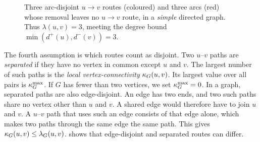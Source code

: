 \begin{figure}[ht]

\caption{Three arc-disjoint $u\to v$ routes (coloured) and three arcs (red) whose removal leaves no $u\to v$ route, in a \emph{simple} directed graph. Thus $\lambda(u,v)=3$, meeting the degree bound $\min(d^+(u),d^-(v))=3$.}
\label{fig:directed-lambda}
\end{figure}

The fourth assumption is which routes count as disjoint.
Two $u$--$v$ paths are \emph{separated} if they have no vertex in common except $u$ and $v$.
The largest number of such paths is the \emph{local vertex-connectivity} $\kappa_G(u,v)$.
Its largest value over all pairs is $\kappa_G^{\max}$.
If $G$ has fewer than two vertices, we set $\kappa_G^{\max}=0$.
In a graph, separated paths are also edge-disjoint. An edge has two ends, and two such paths share no vertex other than $u$ and $v$. A shared edge would therefore have to join $u$ and $v$. A $u$--$v$ path that uses such an edge consists of that edge alone, which makes two paths through the same edge the same path. This gives $\kappa_G(u,v)\le\lambda_G(u,v)$.
 shows that edge-disjoint and separated routes can differ.

